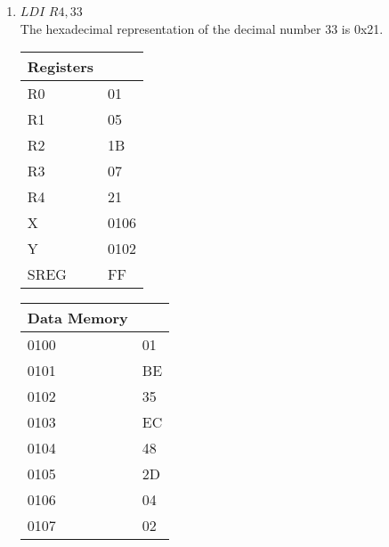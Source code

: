\documentclass[12pt,letterpaper]{article}
\begin{document}
\begin{enumerate}
\begin{enumerate}[i]
    \item $LDI$  $R4,33$\\
        The hexadecimal representation of the decimal number 33 is 0x21. \\
        \begin{tabular}{l l}
            Registers & \\
            \hline
            R0   & 01 \\
            R1   & 05 \\
            R2   & 1B \\
            R3   & 07 \\
            R4   & 21 \\
            X    & 0106 \\
            Y    & 0102 \\
            SREG & FF \\
        \end{tabular}
        \begin{tabular}{l l}
            Data Memory & \\
            \hline
            0100 & 01 \\
            0101 & BE \\
            0102 & 35 \\
            0103 & EC \\
            0104 & 48 \\
            0105 & 2D \\
            0106 & 04 \\
            0107 & 02 \\
        \end{tabular}


\end{enumerate}
\end{enumerate}
\end{document}
